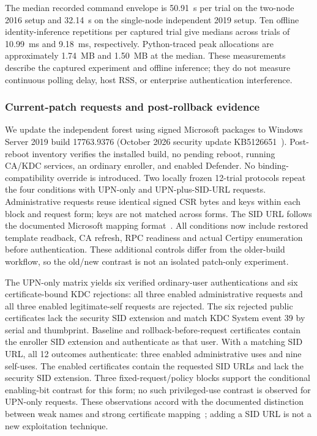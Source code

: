 The median recorded command envelope is 50.91~s per trial on the two-node 2016 setup and 32.14~s on the single-node independent 2019 setup. Ten offline identity-inference repetitions per captured trial give medians across trials of 10.99~ms and 9.18~ms, respectively. Python-traced peak allocations are approximately 1.74~MB and 1.50~MB at the median. These measurements describe the captured experiment and offline inference; they do not measure continuous polling delay, host RSS, or enterprise authentication interference.

\subsubsection{Current-patch requests and post-rollback evidence}
We update the independent forest using signed Microsoft packages to Windows Server 2019 build 17763.9376 (October 2026 security update KB5126651~\cite{microsoft2026october2019}). Post-reboot inventory verifies the installed build, no pending reboot, running CA/KDC services, an ordinary enroller, and enabled Defender. No binding-compatibility override is introduced. Two locally frozen 12-trial protocols repeat the four conditions with UPN-only and UPN-plus-SID-URL requests. Administrative requests reuse identical signed CSR bytes and keys within each block and request form; keys are not matched across forms. The SID URL follows the documented Microsoft mapping format~\cite{microsoft2025pkcasid}. All conditions now include restored template readback, CA refresh, RPC readiness and actual Certipy enumeration before authentication. These additional controls differ from the older-build workflow, so the old/new contrast is not an isolated patch-only experiment.



The UPN-only matrix yields six verified ordinary-user authentications and six certificate-bound KDC rejections: all three enabled administrative requests and all three enabled legitimate-self requests are rejected. The six rejected public certificates lack the security SID extension and match KDC System event 39 by serial and thumbprint. Baseline and rollback-before-request certificates contain the enroller SID extension and authenticate as that user. With a matching SID URL, all 12 outcomes authenticate: three enabled administrative uses and nine self-uses. The enabled certificates contain the requested SID URLs and lack the security SID extension. Three fixed-request/policy blocks support the conditional enabling-bit contrast for this form; no such privileged-use contrast is observed for UPN-only requests. These observations accord with the documented distinction between weak names and strong certificate mapping~\cite{microsoft2025strongbinding,microsoft2025pkcasid}; adding a SID URL is not a new exploitation technique.

